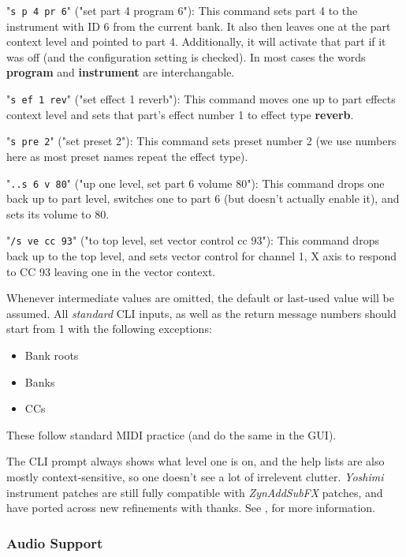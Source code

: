 \documentclass[
 11pt,
 twoside,
 a4paper,
 final                                 %
]{article}
\begin{document}
   "\texttt{s p 4 pr 6}" ("set part 4 program 6"):
   This command sets part 4 to the instrument with ID 6 from the current bank.
   It also then leaves one at the part context level and pointed to part 4.
   Additionally, it will activate that part if it was off (and the
   configuration setting is checked). In most cases the words \textbf{program}
   and \textbf{instrument} are interchangable.

   "\texttt{s ef 1 rev}" ("set effect 1 reverb"):
   This command moves one up to part effects context level and sets that part's
   effect number 1 to effect type \textbf{reverb}.

   "\texttt{s pre 2}" ("set preset 2"):
   This command sets preset number 2 (we use numbers here as most preset names
   repeat the effect type).

   "\texttt{..s 6 v 80}" ("up one level, set part 6 volume 80"):
   This command drops one back up to part level, switches one to part 6 (but doesn't actually enable it), and
   sets its volume to 80.

   "\texttt{/s ve cc 93}" ("to top level, set vector control cc 93"):
   This command drops back up to the top level, and sets vector control for
   channel 1, X axis to respond to CC 93 leaving one in the vector context.

   Whenever intermediate values are omitted, the default or last-used value
   will be assumed.
       All \textsl{standard} CLI inputs, as well as the return message numbers
       should start from 1 with the following exceptions:

    \begin{itemize}
       \item Bank roots
       \item Banks
       \item CCs
       \end{itemize}

   These follow standard MIDI practice (and do the same in the GUI).

   The CLI prompt always
   shows what level one is on, and the help lists are also mostly
   context-sensitive, so one doesn't see a lot of irrelevent clutter.
   \textsl{Yoshimi} instrument patches are still fully
   compatible with \textsl{ZynAddSubFX} patches, and have ported across
   new refinements with thanks.
   See , for more information.

\subsubsection{Audio Support}
\label{subsubsec:new_features_audio_support}
\end{document}
